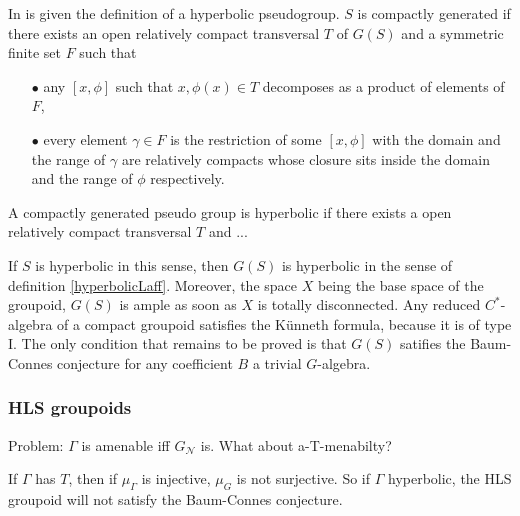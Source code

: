 In \cite{nekrashevych} is given the definition of a hyperbolic pseudogroup. $S$ is compactly generated if there exists an open relatively compact transversal $T$ of $G(S)$ and a symmetric finite set $F$ such that
\begin{itemize}
\item[$\bullet$] any $[x,\phi]$ such that $x, \phi(x)\in T$ decomposes as a product of elements of $F$,
\item[$\bullet$] every element $\gamma \in F$ is the restriction of some $[x,\phi]$ with the domain and the range of $\gamma $ are relatively compacts whose closure sits inside the domain and the range of $\phi$ respectively. 
\end{itemize}

\begin{definition}
A compactly generated pseudo group is hyperbolic if there exists a open relatively compact transversal $T$ and ...
\end{definition}

If $S$ is hyperbolic in this sense, then $G(S)$ is hyperbolic in the sense of definition \ref{hyperbolicLaff}. Moreover, the space $X$ being the base space of the groupoid, $G(S)$ is ample as soon as $X$ is totally disconnected. Any reduced $C^*$-algebra of a compact groupoid satisfies the Künneth formula, because it is of type I. The only condition that remains to be proved is that $G(S)$ satifies the Baum-Connes conjecture for any coefficient $B$ a trivial $G$-algebra.  

\subsubsection{HLS groupoids}

Problem: $\Gamma$ is amenable iff $G_{\mathcal N}$ is. What about a-T-menabilty?

If $\Gamma $ has $T$, then if $\mu_\Gamma$ is injective, $\mu_G  $ is not surjective. So if $\Gamma$ hyperbolic, the HLS groupoid will not satisfy the Baum-Connes conjecture.
























